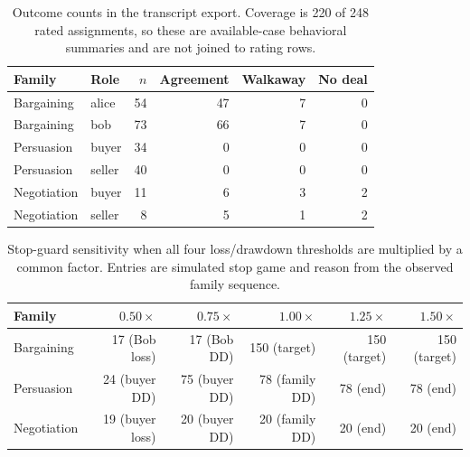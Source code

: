 \begin{table}[t]
\caption{Outcome counts in the transcript export. Coverage is 220 of 248 rated assignments, so these are available-case behavioral summaries and are not joined to rating rows.}
\label{tab:v33-transcript-outcomes}
\centering\scriptsize
\begin{tabular}{llrrrr}
\toprule
Family & Role & $n$ & Agreement & Walkaway & No deal \\
\midrule
Bargaining & alice & 54 & 47 & 7 & 0 \\
Bargaining & bob & 73 & 66 & 7 & 0 \\
Persuasion & buyer & 34 & 0 & 0 & 0 \\
Persuasion & seller & 40 & 0 & 0 & 0 \\
Negotiation & buyer & 11 & 6 & 3 & 2 \\
Negotiation & seller & 8 & 5 & 1 & 2 \\
\bottomrule
\end{tabular}
\end{table}

\begin{table}[t]
\caption{Stop-guard sensitivity when all four loss/drawdown thresholds are multiplied by a common factor. Entries are simulated stop game and reason from the observed family sequence.}
\label{tab:v33-stop-sensitivity}
\centering\scriptsize
\begin{tabular}{lrrrrr}
\toprule
Family & $0.50\times$ & $0.75\times$ & $1.00\times$ & $1.25\times$ & $1.50\times$ \\
\midrule
Bargaining & 17 (Bob loss) & 17 (Bob DD) & 150 (target) & 150 (target) & 150 (target) \\
Persuasion & 24 (buyer DD) & 75 (buyer DD) & 78 (family DD) & 78 (end) & 78 (end) \\
Negotiation & 19 (buyer loss) & 20 (buyer DD) & 20 (family DD) & 20 (end) & 20 (end) \\
\bottomrule
\end{tabular}
\end{table}
